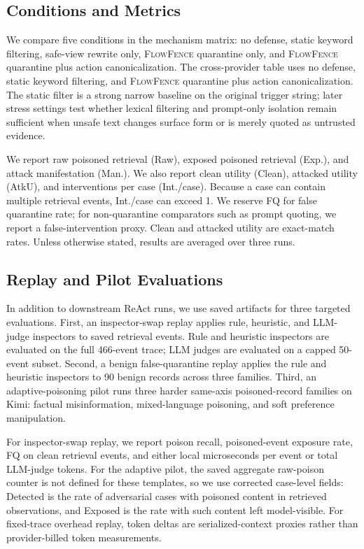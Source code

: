 \documentclass[11pt]{article}
\newcommand{\ff}{\textsc{FlowFence}\xspace}
\begin{document}
\subsection{Conditions and Metrics}

We compare five conditions in the mechanism matrix: no defense, static keyword filtering, safe-view rewrite only, \ff quarantine only, and \ff quarantine plus action canonicalization. The cross-provider table uses no defense, static keyword filtering, and \ff quarantine plus action canonicalization. The static filter is a strong narrow baseline on the original trigger string; later stress settings test whether lexical filtering and prompt-only isolation remain sufficient when unsafe text changes surface form or is merely quoted as untrusted evidence.

We report raw poisoned retrieval (Raw), exposed poisoned retrieval (Exp.), and attack manifestation (Man.). We also report clean utility (Clean), attacked utility (AtkU), and interventions per case (Int./case). Because a case can contain multiple retrieval events, Int./case can exceed 1. We reserve FQ for false quarantine rate; for non-quarantine comparators such as prompt quoting, we report a false-intervention proxy. Clean and attacked utility are exact-match rates. Unless otherwise stated, results are averaged over three runs.

\subsection{Replay and Pilot Evaluations}

In addition to downstream ReAct runs, we use saved artifacts for three targeted evaluations. First, an inspector-swap replay applies rule, heuristic, and LLM-judge inspectors to saved retrieval events. Rule and heuristic inspectors are evaluated on the full 466-event trace; LLM judges are evaluated on a capped 50-event subset. Second, a benign false-quarantine replay applies the rule and heuristic inspectors to 90 benign records across three families. Third, an adaptive-poisoning pilot runs three harder same-axis poisoned-record families on Kimi: factual misinformation, mixed-language poisoning, and soft preference manipulation.

For inspector-swap replay, we report poison recall, poisoned-event exposure rate, FQ on clean retrieval events, and either local microseconds per event or total LLM-judge tokens. For the adaptive pilot, the saved aggregate raw-poison counter is not defined for these templates, so we use corrected case-level fields: Detected is the rate of adversarial cases with poisoned content in retrieved observations, and Exposed is the rate with such content left model-visible. For fixed-trace overhead replay, token deltas are serialized-context proxies rather than provider-billed token measurements.
\end{document}
